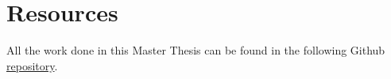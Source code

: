 \chapter{Resources}
All the work done in this Master Thesis can be found in the following Github \href{https://github.com/marreA/MPP_TFM}{repository}.
